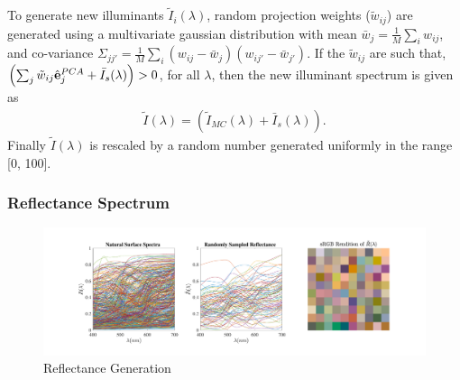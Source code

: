 \documentclass{jov}
\begin{document}
To generate new illuminants $\tilde{I}_i(\lambda)$, random 
projection weights ($\tilde{w}_{ij}$) are generated using a multivariate 
gaussian distribution with mean $\bar{w}_j = \frac{1}{M}\sum_i w_{ij}$, 
and co-variance $\Sigma_{jj'} = \frac{1}{M} \sum_i \left(w_{ij} -\bar{w}_j\right)\left(w_{ij'} -\bar{w}_{j'}\right) $. If the $\tilde{w}_{ij}$ are such that, $\left( \sum_j \tilde{w}_{ij} \hat{{\bf e}}_j^{PCA} +  \bar{I}_{s} (\lambda)\right) > 0$, for all $\lambda$, then the new illuminant spectrum is given as 
\begin{align}
\tilde{I}(\lambda) = \left( \tilde{I}_{MC}(\lambda) + \bar{I}_{s}(\lambda)\right).
\end{align}
Finally $\tilde{I}(\lambda)$ is rescaled by a random number generated uniformly in the range [0, 100].

\subsubsection{Reflectance Spectrum}
\begin{figure}
\centering
	\includegraphics[width=\textwidth]{../Figures/Figure13/Figure13.pdf}
    \caption{Reflectance Generation}
    \label{fig:reflectanceGeneration}
\end{figure}
\end{document}
